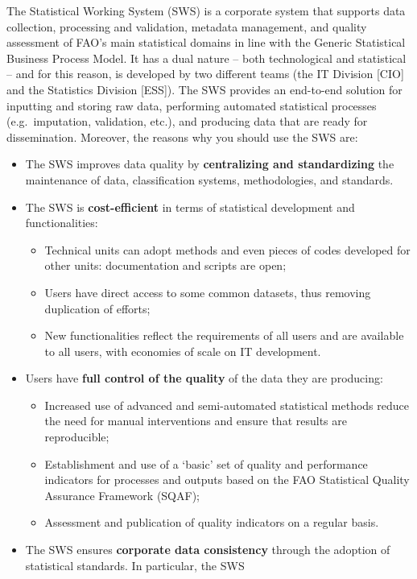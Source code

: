 \documentclass[
]{book}
\providecommand{\tightlist}{%
  \setlength{\itemsep}{0pt}\setlength{\parskip}{0pt}}
\begin{document}
The Statistical Working System (SWS) is a corporate system that supports data collection, processing and validation, metadata management, and quality assessment of FAO's main statistical domains in line with the Generic Statistical Business Process Model. It has a dual nature -- both technological and statistical -- and for this reason, is developed by two different teams (the IT Division {[}CIO{]} and the Statistics Division {[}ESS{]}). The SWS provides an end-to-end solution for inputting and storing raw data, performing automated statistical processes (e.g.~imputation, validation, etc.), and producing data that are ready for dissemination. Moreover, the reasons why you should use the SWS are:

\begin{itemize}
\tightlist
\item
  The SWS improves data quality by \textbf{centralizing and standardizing} the maintenance of data, classification systems, methodologies, and standards.
\item
  The SWS is \textbf{cost-efficient} in terms of statistical development and functionalities:

  \begin{itemize}
  \tightlist
  \item
    Technical units can adopt methods and even pieces of codes developed for other units: documentation and scripts are open;
  \item
    Users have direct access to some common datasets, thus removing duplication of efforts;
  \item
    New functionalities reflect the requirements of all users and are available to all users, with economies of scale on IT development.
  \end{itemize}
\item
  Users have \textbf{full control of the quality} of the data they are producing:

  \begin{itemize}
  \tightlist
  \item
    Increased use of advanced and semi-automated statistical methods reduce the need for manual interventions and ensure that results are reproducible;
  \item
    Establishment and use of a `basic' set of quality and performance indicators for processes and outputs based on the FAO Statistical Quality Assurance Framework (SQAF);
  \item
    Assessment and publication of quality indicators on a regular basis.
  \end{itemize}
\item
  The SWS ensures \textbf{corporate data consistency} through the adoption of statistical standards. In particular, the SWS


\end{itemize}
\end{document}
